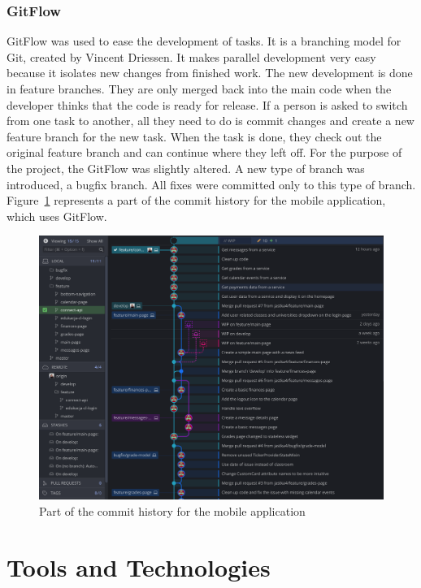 \subsubsection{GitFlow}
GitFlow was used to ease the development of tasks. It is a branching model for Git, created by Vincent Driessen. It makes parallel development very easy because it isolates new changes from finished work. The new development is done in feature branches. They are only merged back into the main code when the developer thinks that the code is ready for release. If a person is asked to switch from one task to another, all they need to do is commit changes and create a new feature branch for the new task. When the task is done, they check out the original feature branch and can continue where they left off.
For the purpose of the project, the GitFlow was slightly altered. A new type of branch was introduced, a bugfix branch. All fixes were committed only to this type of branch. Figure~\ref{fig:gitflow} represents a part of the commit history for the mobile application, which uses GitFlow.

\begin{figure}[htb]
    \centering
    \includegraphics[width=\textwidth]{fig04/gitflow.png}
    \caption{Part of the commit history for the mobile application} \label{fig:gitflow}
\end{figure}

\section{Tools and Technologies}
